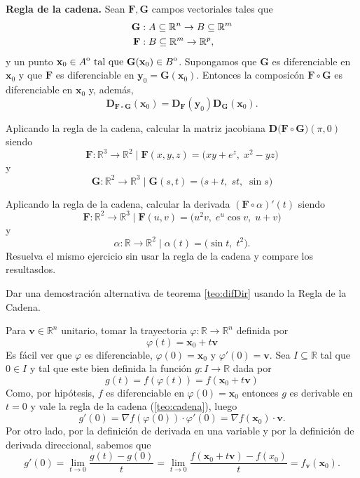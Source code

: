 
\begin{theorem}\textbf{Regla de la cadena.} \label{teo:cadena}  Sean $\mathbf{F}, \mathbf{G}$ campos vectoriales tales que
    \begin{align*}
    \mathbf{G} &:A  \subseteq  \mathbb{R}^n \to B  \subseteq  \mathbb{R}^m \\
    \mathbf{F} &:B  \subseteq  \mathbb{R}^m \to \mathbb{R}^p,
    \end{align*}
  y un punto $\mathbf{x}_0 \in {\kern0ptA}^{\mathrm{o}} \text{ tal que } \mathbf{G}(\mathbf{x}_0) \in {\kern0ptB}^{\mathrm{o}}$. Supongamos que $\mathbf{G}$ es diferenciable en $\mathbf{x}_0$ y que $\mathbf{F}$ es diferenciable en $\mathbf{y}_0 = \mathbf{G}(\mathbf{x}_0)$. Entonces la composic\'on $\mathbf{F} \circ \mathbf{G}$ es diferenciable en $\mathbf{x}_0$ y, adem\'as,
  \[
   \boldsymbol{D}_{\mathbf{F} \circ \mathbf{G}}{(\mathbf{x}_0)} = \boldsymbol{D}_\mathbf{F}{(\mathbf{y}_0)} 
   \boldsymbol{D}_\mathbf{G}{(\mathbf{x}_0)}.
  \]
\end{theorem}




\begin{tarea} Aplicando la regla de la cadena, calcular la matriz jacobiana  $\boldsymbol{D} \big(  \mathbf{F}  \circ \mathbf{G} \big)(\pi,0)$ siendo
$$  \mathbf{F}:\mathbb{R}^3\to\mathbb{R}^2 \mid  \mathbf{F}(x,y,z)=\big( xy + e^{z},\; x^{2}-yz \big)$$ y $$ \mathbf{G}:\mathbb{R}^2\to\mathbb{R}^3 \mid  \mathbf{G}(s,t)=\big( s+t,\; st,\; \sin s \big)$$
\end{tarea}




\begin{tarea}  Aplicando la regla de la cadena, calcular  la derivada $(\mathbf{F} \circ \alpha)'(t)$ siendo 
  $$\mathbf{F}:\mathbb{R}^2 \to \mathbb{R}^3 \mid  \mathbf{F}(u,v) = \big(u^2v,\; e^u \cos v,\; u+v\big)$$  y   $$\alpha:\mathbb{R} \to \mathbb{R}^2 \mid 
\alpha(t) = \big(\sin t,\; t^2\big).$$ 
Resuelva el mismo ejercicio sin usar  la regla de la cadena y compare los resultasdos. 
\end{tarea}

\begin{tarea} Dar una demostraci\'on alternativa de teorema \ref{teo:difDir} usando la Regla de la Cadena. 
\end{tarea} Para $\mathbf{v} \in\mathbb{R}^n$ unitario, tomar la trayectoria $\varphi:\mathbb{R}\to\mathbb{R}^n$  definida por 
$$
\varphi(t) = \mathbf{x}_0  + t\mathbf{v}
$$
 Es f\'acil ver que $\varphi$  es diferenciable,  $\varphi(0)=\mathbf{x}_0$  y  $\varphi'(0)=\mathbf{v}$.   Sea  $I \subseteq \mathbb{R}$ tal que $0\in I$ y tal que este bien definida la funci\'on  $g: I \to\mathbb{R}$ dada por 
$$g(t) = f(\varphi(t)) = f(\mathbf{x}_0+t\mathbf{v})$$
Como, por hip\'otesis,  $f$ es diferenciable en $\varphi(0)=\mathbf{x}_0$ entonces $g$ es derivable en $t=0$ y vale la regla de la cadena (\ref{teo:cadena}), luego
$$g'(0) = \nabla f(\varphi(0)) \cdot \varphi'(0) =  \nabla f(\mathbf{x}_0)\cdot \mathbf{v}.$$
Por otro lado,  por la definición de derivada en una variable y  por la definición de derivada direccional, sabemos que
\[
g'(0) = \lim_{t \to 0}\frac{g(t)-g(0)}{t}= \lim_{t \to 0}\frac{f(\mathbf{x}_0 +t \mathbf{v})-f(x_0)}{t} =  f_{\mathbf{v}}(\mathbf{x}_0).
\]

 